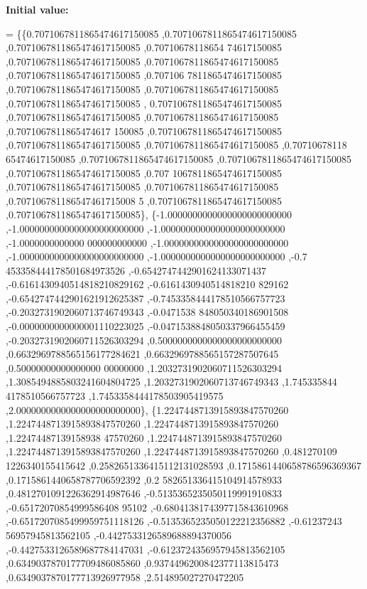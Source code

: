 {\bfseries Initial value\+:}
\begin{DoxyCode}
= \{\{0.7071067811865474617150085 ,0.7071067811865474617150085 ,0.7071067811865474617150085 ,0.70710678118654
      74617150085 ,0.7071067811865474617150085 ,0.7071067811865474617150085 ,0.7071067811865474617150085 ,0.707106
      7811865474617150085 ,0.7071067811865474617150085 ,0.7071067811865474617150085 ,0.7071067811865474617150085 ,
      0.7071067811865474617150085 ,0.7071067811865474617150085 ,0.7071067811865474617150085 ,0.7071067811865474617
      150085 ,0.7071067811865474617150085 ,0.7071067811865474617150085 ,0.7071067811865474617150085 ,0.70710678118
      65474617150085 ,0.7071067811865474617150085 ,0.7071067811865474617150085 ,0.7071067811865474617150085 ,0.707
      1067811865474617150085 ,0.7071067811865474617150085 ,0.7071067811865474617150085 ,0.707106781186547461715008
      5 ,0.7071067811865474617150085 ,0.7071067811865474617150085\},
\{-1.0000000000000000000000000 ,-1.0000000000000000000000000 ,-1.0000000000000000000000000 ,-1.0000000000000
      000000000000 ,-1.0000000000000000000000000 ,-1.0000000000000000000000000 ,-1.0000000000000000000000000 ,-0.7
      453358444178501684973526 ,-0.6542747442901624133071437 ,-0.6161430940514818210829162 ,-0.6161430940514818210
      829162 ,-0.6542747442901621912625387 ,-0.7453358444178510566757723 ,-0.2032731902060713746749343 ,-0.0471538
      848050340186901508 ,-0.0000000000000001110223025 ,-0.0471538848050337966455459 ,-0.2032731902060711526303294
       ,0.5000000000000000000000000 ,0.6632969788565156177284621 ,0.6632969788565157287507645 ,0.50000000000000000
      00000000 ,1.2032731902060711526303294 ,1.3085494885803241604804725 ,1.2032731902060713746749343 ,1.745335844
      4178510566757723 ,1.7453358444178503905419575 ,2.0000000000000000000000000\},
\{1.2247448713915893847570260 ,1.2247448713915893847570260 ,1.2247448713915893847570260 ,1.22474487139158938
      47570260 ,1.2247448713915893847570260 ,1.2247448713915893847570260 ,1.2247448713915893847570260 ,0.481270109
      1226340155415642 ,0.2582651336415112131028593 ,0.1715861440658786596369367 ,0.1715861440658787706592392 ,0.2
      582651336415104914578933 ,0.4812701091226362914987646 ,-0.5135365235050119991910833 ,-0.65172070854999586408
      95102 ,-0.6804138174397715843610968 ,-0.6517207085499959751118126 ,-0.5135365235050122212356882 ,-0.61237243
      56957945813562105 ,-0.4427533126589688894370056 ,-0.4427533126589687784147031 ,-0.6123724356957945813562105 
      ,0.6349037870177709486085860 ,0.9374496200842377113815473 ,0.6349037870177713926977958 ,2.514895027270472205

\end{DoxyCode}
